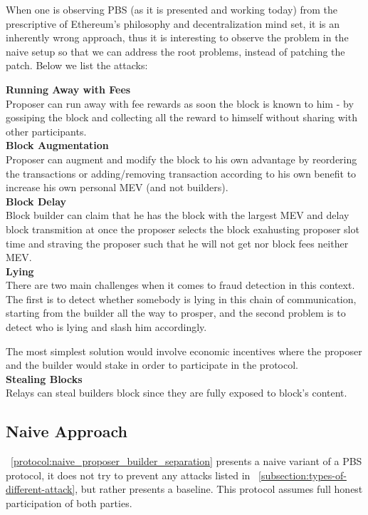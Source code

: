 When one is observing PBS (as it is presented and working today) from the prescriptive of Ethereum's philosophy and decentralization mind set, it is an inherently wrong approach, thus it is interesting to observe the problem in the naive setup so that we can address the root problems, instead of patching the patch. Below we list the attacks:

\noindent\textbf{Running Away with Fees}\\[4pt]
Proposer can run away with fee rewards as soon the block is known to him - by gossiping the block and collecting all the reward to himself without sharing with other participants. 
\\[8pt]
\noindent\textbf{Block Augmentation}\\[4pt]
Proposer can augment and modify the block to his own advantage by reordering the transactions or adding/removing transaction according to his own benefit to increase his own personal MEV (and not builders).
\\[8pt]
\noindent\textbf{Block Delay}\\[4pt]
Block builder can claim that he has the block with the largest MEV and delay block transmition at once the proposer selects the block exahusting proposer slot time and straving the proposer such that he will not get nor block fees neither MEV.
\\[8pt]
\noindent\textbf{Lying}\\[4pt]
There are two main challenges when it comes to fraud detection in this context. The first is to detect whether somebody is lying in this chain of communication, starting from the builder all the way to prosper, and the second problem is to detect who is lying and slash him accordingly.

The most simplest solution would involve economic incentives where the proposer and the builder would stake in order to participate in the protocol.
\\[8pt]
\noindent\textbf{Stealing Blocks}\\[4pt]
Relays can steal builders block since they are fully exposed to block's content.

\subsection{Naive Approach}

~\ref{protocol:naive_proposer_builder_separation} presents a naive variant of a PBS protocol, it does not try to prevent any attacks listed in ~\ref{subsection:types-of-different-attack}, but rather presents a baseline. This protocol assumes full honest participation of both parties.

